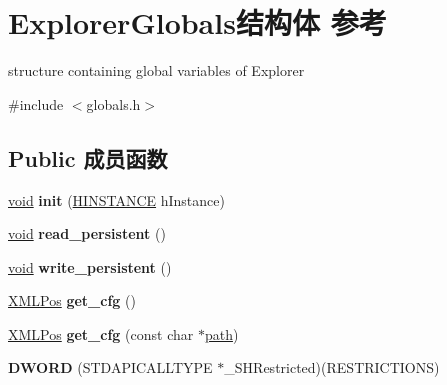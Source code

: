 \hypertarget{struct_explorer_globals}{}\section{Explorer\+Globals结构体 参考}
\label{struct_explorer_globals}


structure containing global variables of Explorer  




{\ttfamily \#include $<$globals.\+h$>$}

\subsection*{Public 成员函数}
\begin{DoxyCompactItemize}
\item 
\mbox{\label{struct_explorer_globals_a034beece2e1f9d8604c1aa17bc689d62}} 
\hyperlink{interfacevoid}{void} {\bfseries init} (\hyperlink{interfacevoid}{H\+I\+N\+S\+T\+A\+N\+CE} h\+Instance)
\item 
\mbox{\label{struct_explorer_globals_aa9f2a26d90eeb611fe418a81afb71472}} 
\hyperlink{interfacevoid}{void} {\bfseries read\+\_\+persistent} ()
\item 
\mbox{\label{struct_explorer_globals_a74d2aaa49b3379dc07a8fc8f4cf8cff9}} 
\hyperlink{interfacevoid}{void} {\bfseries write\+\_\+persistent} ()
\item 
\mbox{\label{struct_explorer_globals_ae5dc6710af16800f0d808e8a99ac04bc}} 
\hyperlink{struct_x_m_l_storage_1_1_x_m_l_pos}{X\+M\+L\+Pos} {\bfseries get\+\_\+cfg} ()
\item 
\mbox{\label{struct_explorer_globals_a3666ca1d34846dd61a7282b446050514}} 
\hyperlink{struct_x_m_l_storage_1_1_x_m_l_pos}{X\+M\+L\+Pos} {\bfseries get\+\_\+cfg} (const char $\ast$\hyperlink{structpath}{path})
\item 
\mbox{\label{struct_explorer_globals_ae152fd3b92796b94f6e83087fb5fc4af}} 
{\bfseries D\+W\+O\+RD} (S\+T\+D\+A\+P\+I\+C\+A\+L\+L\+T\+Y\+PE $\ast$\+\_\+\+S\+H\+Restricted)(R\+E\+S\+T\+R\+I\+C\+T\+I\+O\+NS)
\end{DoxyCompactItemize}
